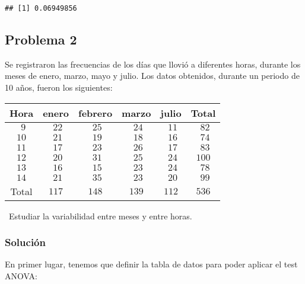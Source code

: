 \documentclass[
]{article}
\begin{document}
\begin{verbatim}
## [1] 0.06949856
\end{verbatim}

\hypertarget{problema-2}{%
\subsection{Problema 2}\label{problema-2}}

Se registraron las frecuencias de los días que llovió a diferentes
horas, durante los meses de enero, marzo, mayo y julio. Los datos
obtenidos, durante un periodo de 10 años, fueron los siguientes:
~\newline

\begin{center}
\begin{tabular}{|c||c|c|c|c||c|}
\hline
Hora&enero&febrero&marzo&julio&Total\\\hline\hline
$\ \,9$&$\ \,22$&$\ \,25$&$\ \,24$&$\ \,11$&$\ \,82$\\\hline
$10$&$\ \,21$&$\ \,19$&$\ \,18$&$\ \,16$&$\ \,74$\\\hline
$11$&$\ \,17$&$\ \,23$&$\ \,26$&$\ \,17$&$\ \,83$\\\hline
$12$&$\ \,20$&$\ \,31$&$\ \,25$&$\ \,24$&$100$\\\hline
$13$&$\ \,16$&$\ \,15$&$\ \,23$&$\ \,24$&$\ \,78$\\\hline
$14$&$\ \,21$&$\ \,35$&$\ \,23$&$\ \,20$&$\ \,99$\\\hline\hline
Total&$117$&$148$&$139$&$112$&$536$\\\hline
\end{tabular}
\end{center}

~\newline Estudiar la variabilidad entre meses y entre horas.

\hypertarget{soluciuxf3n-1}{%
\subsubsection{Solución}\label{soluciuxf3n-1}}

En primer lugar, tenemos que definir la tabla de datos para poder
aplicar el test ANOVA:
\end{document}
